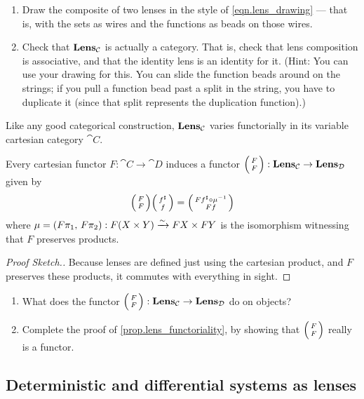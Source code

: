 \documentclass[DynamicalBook]{subfiles}
\begin{document}
\begin{exercise}
  \begin{enumerate}
  	\item Draw the composite of two lenses in the style of \eqref{eqn.lens_drawing} --- that is, with the sets as wires and the functions as beads on those wires.
   	\item Check that $\textbf{Lens}_{\mathcal{C}}$ is actually a category. That is, check that
    lens composition is associative, and that the identity lens is an identity
    for it. (Hint: You can use your drawing for this. You can slide the function
    beads around on the strings; if you pull a function bead past a split in the
    string, you have to duplicate it (since that split represents the
    duplication function).)
  \qedhere
  \end{enumerate}
\end{exercise}

Like any good categorical construction, $\textbf{Lens}_{\mathcal{C}}$ varies
functorially in its variable cartesian category $\cat{C}$.
\begin{proposition}\label{prop.lens_functoriality}
  Every cartesian functor $F : \cat{C} \to \cat{D}$ induces a functor
  $\lens{F}{F} : \Cat{Lens}_{\cat{C}} \to \Cat{Lens}_{\cat{D}}$ given by
  $$\lens{F}{F}\lens{f^{\sharp}}{f} = \lens{Ff^{\sharp} \circ \mu\inv}{Ff}$$
  where $\mu = (F\pi_1,\, F\pi_2) : F(X \times Y) \xrightarrow{\sim} FX \times FY$ is
  the isomorphism witnessing that $F$ preserves products.
\end{proposition}
\begin{proof}[Proof Sketch.]
  Because lenses are defined just using the cartesian product, and $F$ preserves
  these products, it commutes with everything in sight.
\end{proof}

\begin{exercise}
 \begin{enumerate}
 	\item What does the functor $\lens FF: \Cat{Lens}_{\cat{C}} \to \Cat{Lens}_{\cat{D}}$ do on objects?
	\item Complete the proof of \cref{prop.lens_functoriality}, by showing that $\lens FF$ really is a functor.
	\qedhere
\end{enumerate}
\end{exercise}

\subsection{Deterministic and differential systems as lenses}
\end{document}
